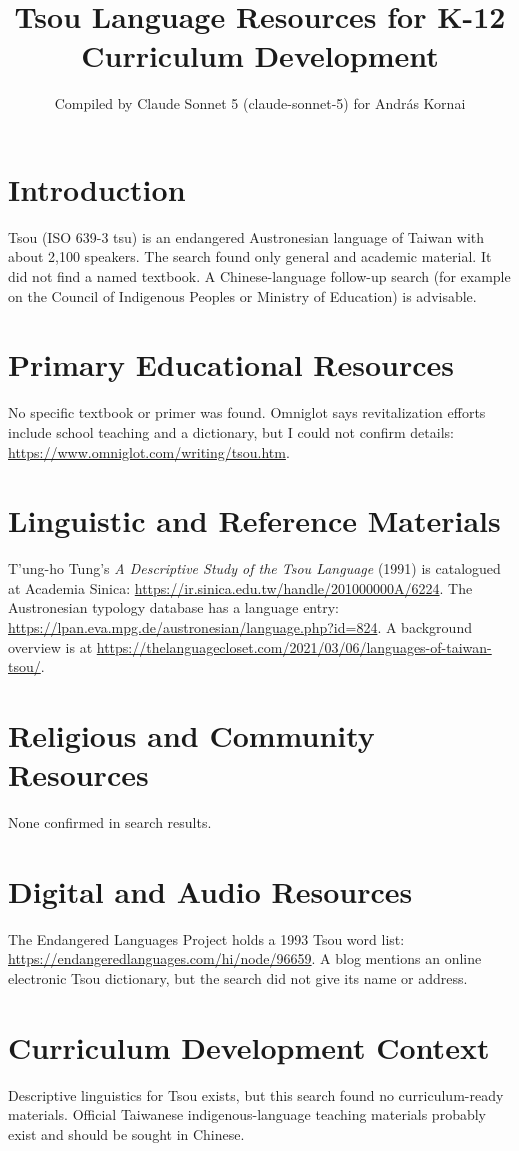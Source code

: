 \documentclass[12pt]{article}
\title{Tsou Language Resources for K-12 Curriculum Development}
\author{Compiled by Claude Sonnet 5 (claude-sonnet-5) for Andr\'as Kornai}
\date{}
\begin{document}
\maketitle
\section{Introduction}
Tsou (ISO 639-3 tsu) is an endangered Austronesian language of Taiwan with about 2,100 speakers. The search found only general and academic material. It did not find a named textbook. A Chinese-language follow-up search (for example on the Council of Indigenous Peoples or Ministry of Education) is advisable.
\section{Primary Educational Resources}
No specific textbook or primer was found. Omniglot says revitalization efforts include school teaching and a dictionary, but I could not confirm details: \url{https://www.omniglot.com/writing/tsou.htm}.
\section{Linguistic and Reference Materials}
T'ung-ho Tung's \emph{A Descriptive Study of the Tsou Language} (1991) is catalogued at Academia Sinica: \url{https://ir.sinica.edu.tw/handle/201000000A/6224}. The Austronesian typology database has a language entry: \url{https://lpan.eva.mpg.de/austronesian/language.php?id=824}. A background overview is at \url{https://thelanguagecloset.com/2021/03/06/languages-of-taiwan-tsou/}.
\section{Religious and Community Resources}
None confirmed in search results.
\section{Digital and Audio Resources}
The Endangered Languages Project holds a 1993 Tsou word list: \url{https://endangeredlanguages.com/hi/node/96659}. A blog mentions an online electronic Tsou dictionary, but the search did not give its name or address.
\section{Curriculum Development Context}
Descriptive linguistics for Tsou exists, but this search found no curriculum-ready materials. Official Taiwanese indigenous-language teaching materials probably exist and should be sought in Chinese.
\end{document}
